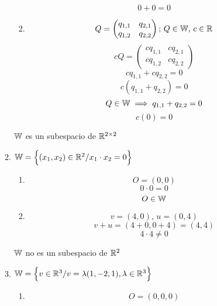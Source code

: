 \documentclass[../practica.root.tex]{subfiles}
\begin{document}
\begin{enumerate}
\begin{enumerate}
\begin{enumerate}
\[\begin{array}{rl}
                                  \end{array}
                              \]
                              \[ 0 + 0 = 0 \]
                        \item \[
                                  Q =
                                  \begin{pmatrix}
                                      q_{1,1} & q_{2,1} \\
                                      q_{1,2} & q_{2,2}
                                  \end{pmatrix}
                                  \text{; }
                                  Q \in \mathbb{W}
                                  \text{, }
                                  c \in \mathbb{R}
                              \]
                              \[
                                  cQ =
                                  \begin{pmatrix}
                                      cq_{1,1} & cq_{2,1} \\
                                      cq_{1,2} & cq_{2,2}
                                  \end{pmatrix}
                              \]
                              \[ cq_{1,1} + cq_{2,2} = 0 \]
                              \[ c(q_{1,1} + q_{2,2}) = 0 \]
                              \[ Q \in \mathbb{W} \implies q_{1,1} + q_{2,2} = 0 \]
                              \[ c(0) = 0 \]
                    \end{enumerate}
                    $\mathbb{W}$ es un subespacio de $\mathbb{R}^{2\times2}$
              \item $ \mathbb{W} = \Big\{ (x_1, x_2) \in \mathbb{R}^2 / x_1 \cdot x_2 = 0 \Big\} $
                    \begin{enumerate}
                        \item \[ O = (0,0) \]
                              \[ 0 \cdot 0 = 0 \]
                              \[ O \in \mathbb{W} \]
                        \item \[ v = (4,0)\text{, } u = (0,4) \]
                              \[ v + u = (4 + 0, 0 + 4) = (4,4) \]
                              \[ 4\cdot4 \neq 0 \]
                    \end{enumerate}
                    $\mathbb{W}$ no es un subespacio de $\mathbb{R}^2$
              \item $ \mathbb{W} = \Big\{ v \in \mathbb{R}^3 / v = \lambda(1,-2,1), \lambda \in \mathbb{R}^3 \Big\} $
                    \begin{enumerate}
                        \item \[ O = (0,0,0) \]

\end{enumerate}
\end{enumerate}
\end{enumerate}
\end{document}
